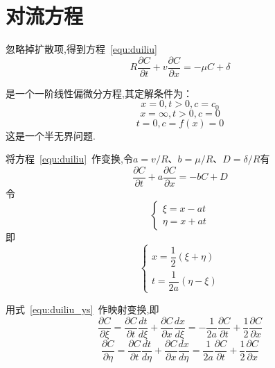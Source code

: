 \section{对流方程}
忽略掉扩散项,得到方程~\eqref{equ:duiliu}
\begin{equation}\label{equ:duiliu}
R\dfrac{\partial C}{\partial t}+v\dfrac{\partial C}{\partial x}= -\mu C + \delta
\end{equation}\par
是一个一阶线性偏微分方程,其定解条件为：
\begin{equation}\label{equ:duiliu_bj}
x=0,t>0,c=c_0
\end{equation}
\begin{equation}
x=\infty,t>0,c=0
\end{equation}
\begin{equation}\label{equ:duiliu_init}
t=0,c=f(x)=0
\end{equation}
这是一个半无界问题.\par
将方程~\eqref{equ:duiliu}~作变换,令$a=v/R$、$b=\mu/R$、$D=\delta/R$有
\begin{equation}\label{equ:duiliu_n}
\dfrac{\partial C}{\partial t}+a\dfrac{\partial C}{\partial x}= -b C + D
\end{equation}
令
\begin{equation}\label{equ:duiliu_ys}
\begin{cases}
\xi=x-at \\
\eta=x+at
\end{cases}
\end{equation}
即
\begin{equation}
\begin{cases}
x=\dfrac{1}{2}(\xi+\eta)\\[1.2em]
t=\dfrac{1}{2a}(\eta-\xi)
\end{cases}
\end{equation}\par
用式~\eqref{equ:duiliu_ys}~作映射变换,即
\begin{equation}
\dfrac{\partial C}{\partial \xi}=\dfrac{\partial C}{\partial t}\dfrac{dt}{d\xi}+
								 \dfrac{\partial C}{\partial x}\dfrac{dx}{d\xi}
								=-\dfrac{1}{2a}\dfrac{\partial C}{\partial t}+\dfrac{1}{2}\dfrac{\partial C}{\partial x}						
\end{equation}
\begin{equation}
\dfrac{\partial C}{\partial \eta}=\dfrac{\partial C}{\partial t}\dfrac{dt}{d\eta}+
								 \dfrac{\partial C}{\partial x}\dfrac{dx}{d\eta}
								=\dfrac{1}{2a}\dfrac{\partial C}{\partial t}+
								\dfrac{1}{2}\dfrac{\partial C}{\partial x}		
\end{equation}\par
